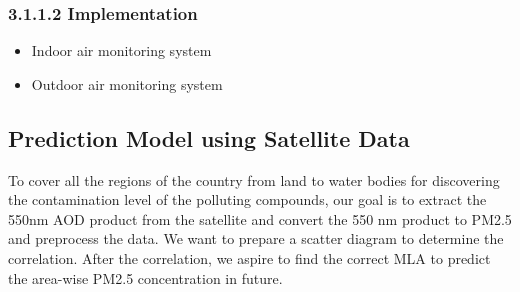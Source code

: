 \vspace{0.5cm}
\subsubsection{3.1.1.2  Implementation}
\vspace{0.5cm}
\begin{itemize}
    \item Indoor air monitoring system
\item Outdoor air monitoring system
\end{itemize}

\subsection{Prediction Model using Satellite Data}

To cover all the regions of the country from land to water bodies for discovering the contamination level of the polluting compounds,  our goal is to extract the 550nm AOD product from the satellite and convert the 550 nm product to PM2.5 and preprocess the data. We want to prepare a scatter diagram to determine the correlation. After the correlation, we aspire to find the correct MLA to predict the area-wise PM2.5 concentration in future.

